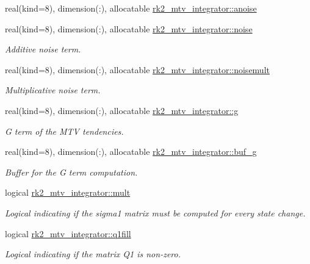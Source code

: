 \begin{DoxyCompactItemize}
real(kind=8), dimension(\+:), allocatable \hyperlink{namespacerk2__mtv__integrator_ad88a9e896280f9afe3d00bf76fe0aa20}{rk2\+\_\+mtv\+\_\+integrator\+::anoise}
\item 
real(kind=8), dimension(\+:), allocatable \hyperlink{namespacerk2__mtv__integrator_a3171418fde58eb68937425899ecdc7af}{rk2\+\_\+mtv\+\_\+integrator\+::noise}
\begin{DoxyCompactList}\small\item\em Additive noise term. \end{DoxyCompactList}\item 
real(kind=8), dimension(\+:), allocatable \hyperlink{namespacerk2__mtv__integrator_a950fc0519ed9785d8126a54cfe3ecce9}{rk2\+\_\+mtv\+\_\+integrator\+::noisemult}
\begin{DoxyCompactList}\small\item\em Multiplicative noise term. \end{DoxyCompactList}\item 
real(kind=8), dimension(\+:), allocatable \hyperlink{namespacerk2__mtv__integrator_a011fd16734ea127ef794053331a8294e}{rk2\+\_\+mtv\+\_\+integrator\+::g}
\begin{DoxyCompactList}\small\item\em G term of the M\+TV tendencies. \end{DoxyCompactList}\item 
real(kind=8), dimension(\+:), allocatable \hyperlink{namespacerk2__mtv__integrator_a9db4772c6d66fba1a175dc7c493c8c6d}{rk2\+\_\+mtv\+\_\+integrator\+::buf\+\_\+g}
\begin{DoxyCompactList}\small\item\em Buffer for the G term computation. \end{DoxyCompactList}\item 
logical \hyperlink{namespacerk2__mtv__integrator_a08097c59dbd88f4ac0624dffb29fd6b1}{rk2\+\_\+mtv\+\_\+integrator\+::mult}
\begin{DoxyCompactList}\small\item\em Logical indicating if the sigma1 matrix must be computed for every state change. \end{DoxyCompactList}\item 
logical \hyperlink{namespacerk2__mtv__integrator_a9fbcf5a43f09dfa39f6ebcacf1b5504c}{rk2\+\_\+mtv\+\_\+integrator\+::q1fill}
\begin{DoxyCompactList}\small\item\em Logical indicating if the matrix Q1 is non-\/zero. \end{DoxyCompactList}\item 

\end{DoxyCompactItemize}
